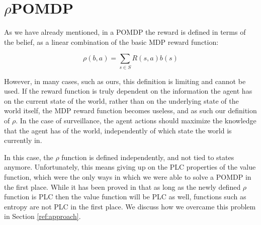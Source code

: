 \section{$\rho$POMDP}

As we have already mentioned, in a POMDP the reward is defined in terms of the belief, as a linear
combination of the basic MDP reward function:

\[ \rho(b,a) = \sum_{s\in S} R(s,a) b(s) \]

However, in many cases, such as ours, this definition is limiting and cannot be used. If the reward
function is truly dependent on the information the agent has on the current state of the world,
rather than on the underlying state of the world itself, the MDP reward function becomes useless,
and as such our definition of $\rho$. In the case of surveillance, the agent actions should maximize
the knowledge that the agent has of the world, independently of which state the world is currently
in.

In this case, the $\rho$ function is defined independently, and not tied to states anymore.
Unfortunately, this means giving up on the PLC properties of the value function, which
were the only ways in which we were able to solve a POMDP in the first place. While it has
been proved in \cite{cit:rpomdp} that as long as the newly defined $\rho$ function is PLC then the
value function will be PLC as well, functions such as entropy are not PLC in the first place. We
discuss how we overcame this problem in Section \ref{ref:approach}.
